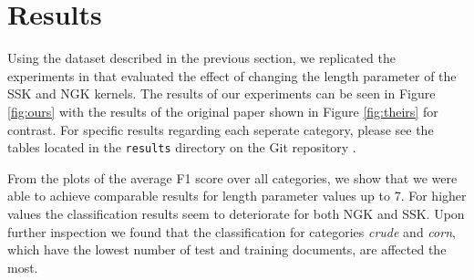 \section{Results} \label{sec:results}

Using the dataset described in the previous section, we replicated the experiments in \cite{ssk} that evaluated the effect of changing the length parameter of the SSK and NGK kernels. The results of our experiments can be seen in Figure \ref{fig:ours} with the results of the original paper shown in Figure \ref{fig:theirs} for contrast. For specific results regarding each seperate category, please see the tables located in the \texttt{results} directory on the Git repository \cite{git}.

From the plots of the average F1 score over all categories, we show that we were able to achieve comparable results for length parameter values up to 7. For higher values the classification results seem to deteriorate for both NGK and SSK. Upon further inspection we found that the classification for categories \textit{crude} and \textit{corn}, which have the lowest number of test and training documents, are affected the most.

